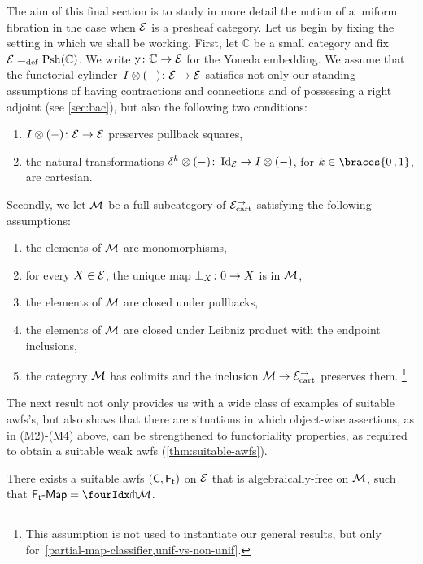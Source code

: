 \documentclass[reqno,10pt,a4paper,oneside,draft]{amsart}
\begin{document}
{{The aim of this final section is to study in more detail the notion of a uniform fibration in the case when $\cal{E}$ is a presheaf category.
Let us begin by fixing the setting in which we shall be working.
First, let $\mathbb{C}$ be a small category and fix $\cal{E} \defeq \Psh(\mathbb{C})$.
We write $\yon \co \mathbb{C} \to \cal{E}$ for the Yoneda embedding.
We assume that the functorial cylinder~$\interval \otimes (-) \co \cal{E} \to \cal{E}$ satisfies not only our standing assumptions of having contractions and connections and of possessing a right adjoint (see \cref{sec:bac}), but also the following two conditions:
\begin{enumerate}[({C}1)]
\item $\interval \otimes (-) \co \cal{E} \to \cal{E}$ preserves pullback squares,
\item the natural transformations $\kcyl \otimes (-) \co \Id_{\cal{E}} \to \interval \otimes (-)$, for $k \in \braces{0\,, 1}$, are cartesian.
\end{enumerate}
Secondly, we let $\cal{M}$ be a full subcategory of $\cal{E}^\to_\cart$ satisfying the following assumptions:
\begin{enumerate}[({M}1)]
\item the elements of $\cal{M}$ are monomorphisms,
\item for every $X \in \cal{E}$, the unique map $\bot_X \co 0 \to X$ is in $\cal{M}$,
\item the elements of $\cal{M}$ are closed under pullbacks,
\item the elements of $\cal{M}$ are closed under Leibniz product with the endpoint inclusions,
\item the category $\cal{M}$ has colimits and the inclusion $\cal{M} \to \cal{E}^\to_\mathrm{cart}$ preserves them.%
\footnote{This assumption is not used to instantiate our general results, but only for~\cref{partial-map-classifier,unif-vs-non-unif}.}
\end{enumerate}
The next result not only provides us with a wide class of examples of suitable awfs's, but also shows that there are situations in which object-wise assertions, as in (M2)-(M4) above, can be strengthened to functoriality properties, as required to obtain a suitable weak awfs (\cref{thm:suitable-awfs}).

\begin{theorem} \label{rem-lift-suitable}
There exists a suitable awfs $(\CC, \TF)$ on $\cal{E}$ that is algebraically-free on $\cal{M}$, \ie such that $\pAlg{\TF} = \liftr{\cal{M}}$.
\end{theorem}

}}
\end{document}

